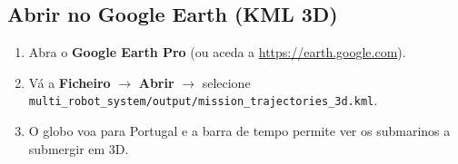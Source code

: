 \documentclass[11pt,a4paper]{article}
\begin{document}
\subsection{Abrir no Google Earth (KML 3D)}
\begin{enumerate}[nosep]
    \item Abra o \textbf{Google Earth Pro} (ou aceda a \url{https://earth.google.com}).
    \item Vá a \textbf{Ficheiro} $\to$ \textbf{Abrir} $\to$ selecione \texttt{multi\_robot\_system/output/mission\_trajectories\_3d.kml}.
    \item O globo voa para Portugal e a barra de tempo permite ver os submarinos a submergir em 3D.
\end{enumerate}
\end{document}
